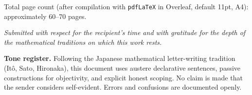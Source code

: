 \documentclass[11pt,a4paper]{article}
\theoremstyle{plain}
\theoremstyle{definition}
\begin{document}
Total page count (after compilation with \texttt{pdfLaTeX} in
Overleaf, default 11pt, A4): approximately 60--70 pages.

\bigskip
\noindent\hrulefill\par
\smallskip\noindent
\textit{Submitted with respect for the recipient's time and with
gratitude for the depth of the mathematical traditions on which
this work rests.}

\bigskip
\noindent\hrulefill\par
\smallskip\noindent
\textbf{Tone register.} Following the Japanese mathematical
letter-writing tradition (It\^{o}, Sato, Hironaka), this document
uses austere declarative sentences, passive constructions for
objectivity, and explicit honest scoping. No claim is made that
the sender considers self-evident. Errors and confusions are
documented openly.
\end{document}

